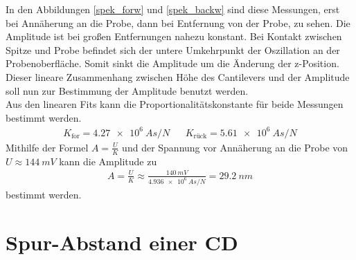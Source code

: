 In den Abbildungen \ref{spek_forw} und \ref{spek_backw} sind diese Messungen, erst
bei Annäherung an die Probe, dann bei Entfernung von der Probe, zu sehen. Die 
Amplitude ist bei großen Entfernungen nahezu konstant. Bei Kontakt zwischen Spitze
und Probe befindet sich der untere Umkehrpunkt der Oszillation an der 
Probenoberfläche.
Somit sinkt die Amplitude um die Änderung der z-Position. Dieser lineare 
Zusammenhang zwischen Höhe des Cantilevers und der Amplitude soll nun zur 
Bestimmung der Amplitude benutzt werden.
\vspace{6pt}\\
Aus den linearen Fits kann die Proportionalitätskonstante für beide Messungen
bestimmt werden.
\begin{align*}
    K_{\text{for}} = \SI{4,27e6}{A s \per N} & & K_{\text{rück}} = 
    \SI{5,61e6}{A s \per N}
\end{align*}
Mithilfe der Formel $\displaystyle A = \frac{U}{K}$ und der Spannung vor Annäherung
an die Probe von $U \approx \SI{144}{mV}$ kann die Amplitude zu
\begin{align*}
    A = \frac{U}{K} \approx \frac{\SI{140}{mV}}{\SI{4,936e6}{A s \per N}} = \SI{29,2}{nm}
\end{align*}
bestimmt werden.

    \section{Spur-Abstand einer CD}

